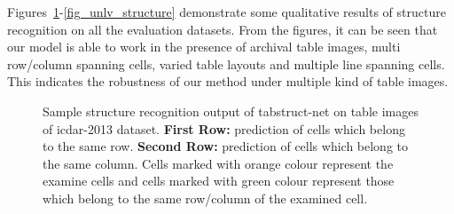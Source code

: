\documentclass[runningheads]{llncs}
\begin{document}
Figures~\ref{fig_icdar_2013_structure}-\ref{fig_unlv_structure} demonstrate some qualitative results of structure recognition on all the evaluation datasets. From the figures, it can be seen that our model is able to work in the presence of archival table images, multi row/column spanning cells, varied table layouts and multiple line spanning cells. This indicates the robustness of our method under multiple kind of table images.

\begin{figure}
\begin{center}
\hspace{-0.01\textwidth}
\hspace{-0.01\textwidth}
\vspace{0.001\textwidth}
\hspace{-0.01\textwidth}
\hspace{-0.01\textwidth}
\end{center}
\caption{Sample structure recognition output of {\sc t}ab{\sc s}truct-{\sc n}et on table images of {\sc icdar}-2013 dataset. \textbf{First Row:} prediction of cells which belong to the same row. \textbf{Second Row:} prediction of cells which belong to the same column. Cells marked with orange colour represent the examine cells and cells marked with green colour represent those which belong to the same row/column of the examined cell.}
\label{fig_icdar_2013_structure}
\end{figure}
\end{document}
